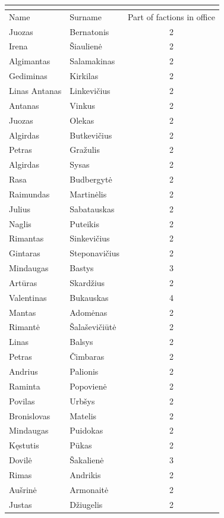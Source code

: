 \documentclass[a4paper,12pt]{article}
\begin{document}
	\begin{center}
			\begin{tabular}{llc}
				\multicolumn{2}{c}{}\\ 
				\hline
				Name & Surname & Part of factions in office \\\hline
				Juozas        & Bernatonis    & 2 \\
				Irena         & Šiaulienė     & 2 \\
				Algimantas    & Salamakinas   & 2 \\
				Gediminas     & Kirkilas      & 2 \\
				Linas Antanas & Linkevičius   & 2 \\
				Antanas       & Vinkus        & 2 \\
				Juozas        & Olekas        & 2 \\
				Algirdas      & Butkevičius   & 2 \\
				Petras        & Gražulis      & 2 \\
				Algirdas      & Sysas         & 2 \\
				Rasa          & Budbergytė    & 2 \\
				Raimundas     & Martinėlis    & 2 \\
				Julius        & Sabatauskas   & 2 \\
				Naglis        & Puteikis      & 2 \\
				Rimantas      & Sinkevičius   & 2 \\
				Gintaras      & Steponavičius & 2 \\
				Mindaugas     & Bastys        & 3 \\
				Artūras       & Skardžius     & 2 \\
				Valentinas    & Bukauskas     & 4 \\
				Mantas        & Adomėnas      & 2 \\
				Rimantė       & Šalaševičiūtė & 2 \\
				Linas         & Balsys        & 2 \\
				Petras        & Čimbaras      & 2 \\
				Andrius       & Palionis      & 2 \\
				Raminta       & Popovienė     & 2 \\
				Povilas       & Urbšys        & 2 \\
				Bronislovas   & Matelis       & 2 \\
				Mindaugas     & Puidokas      & 2 \\
				Kęstutis      & Pūkas         & 2 \\
				Dovilė        & Šakalienė     & 3 \\
				Rimas         & Andrikis      & 2 \\
				Aušrinė       & Armonaitė     & 2 \\
				Justas        & Džiugelis     & 2
			\end{tabular}
			 \label{tab:multi_faction}
	\end{center}
	
\end{document}
